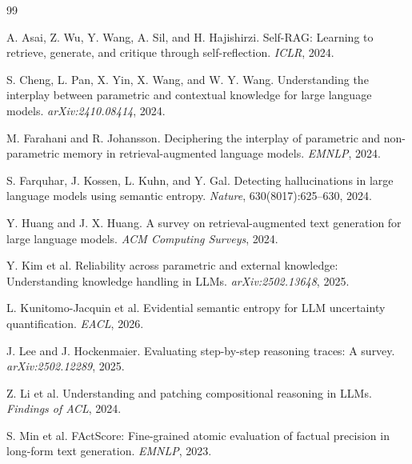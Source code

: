 \documentclass[10pt,letterpaper]{article}
\begin{document}
\begin{thebibliography}{99}\setlength{\itemsep}{1pt}

A. Asai, Z. Wu, Y. Wang, A. Sil, and H. Hajishirzi.
Self-{RAG}: Learning to retrieve, generate, and critique through self-reflection.
\emph{ICLR}, 2024.

S. Cheng, L. Pan, X. Yin, X. Wang, and W. Y. Wang.
Understanding the interplay between parametric and contextual knowledge for large language models.
\emph{arXiv:2410.08414}, 2024.

M. Farahani and R. Johansson.
Deciphering the interplay of parametric and non-parametric memory in retrieval-augmented language models.
\emph{EMNLP}, 2024.

S. Farquhar, J. Kossen, L. Kuhn, and Y. Gal.
Detecting hallucinations in large language models using semantic entropy.
\emph{Nature}, 630(8017):625--630, 2024.

Y. Huang and J. X. Huang.
A survey on retrieval-augmented text generation for large language models.
\emph{ACM Computing Surveys}, 2024.

Y. Kim et al.
Reliability across parametric and external knowledge: Understanding knowledge handling in {LLMs}.
\emph{arXiv:2502.13648}, 2025.

L. Kunitomo-Jacquin et al.
Evidential semantic entropy for {LLM} uncertainty quantification.
\emph{EACL}, 2026.

J. Lee and J. Hockenmaier.
Evaluating step-by-step reasoning traces: A survey.
\emph{arXiv:2502.12289}, 2025.

Z. Li et al.
Understanding and patching compositional reasoning in {LLMs}.
\emph{Findings of ACL}, 2024.

S. Min et al.
{FActScore}: Fine-grained atomic evaluation of factual precision in long-form text generation.
\emph{EMNLP}, 2023.


\end{thebibliography}
\end{document}
